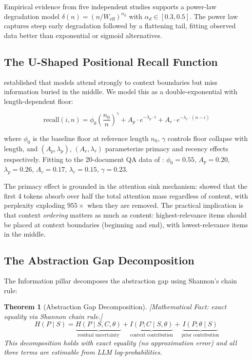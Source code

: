 \documentclass[11pt, a4paper, logo, copyright]{googledeepmind}
\newtheorem{theorem}{Theorem}[section]
\begin{document}
Empirical evidence from five independent studies \citep{chroma2025contextrot, liu2024lost, du2025context} supports a power-law degradation model $\delta(n) = (n/W_{\text{eff}})^{\alpha_d}$ with $\alpha_d \in [0.3, 0.5]$. The power law captures steep early degradation followed by a flattening tail, fitting observed data better than exponential or sigmoid alternatives.

\subsection{The U-Shaped Positional Recall Function}

\citet{liu2024lost} established that models attend strongly to context boundaries but miss information buried in the middle. We model this as a double-exponential with length-dependent floor:

\begin{equation}
    \text{recall}(i, n) = \phi_0 \left(\frac{n_0}{n}\right)^{\!\gamma} + A_p \cdot e^{-\lambda_p \cdot i} + A_r \cdot e^{-\lambda_r \cdot (n - i)}
\end{equation}

where $\phi_0$ is the baseline floor at reference length $n_0$, $\gamma$ controls floor collapse with length, and $(A_p, \lambda_p)$, $(A_r, \lambda_r)$ parameterize primacy and recency effects respectively. Fitting to the 20-document QA data of \citet{liu2024lost}: $\phi_0 = 0.55$, $A_p = 0.20$, $\lambda_p = 0.26$, $A_r = 0.17$, $\lambda_r = 0.15$, $\gamma = 0.23$.

The primacy effect is grounded in the attention sink mechanism: \citet{xiao2024efficient} showed that the first 4 tokens absorb over half the total attention mass regardless of content, with perplexity exploding $955\times$ when they are removed. The practical implication is that context \emph{ordering} matters as much as content: highest-relevance items should be placed at context boundaries (beginning and end), with lowest-relevance items in the middle.

\subsection{The Abstraction Gap Decomposition}

The Information pillar decomposes the abstraction gap using Shannon's chain rule:

\begin{theorem}[Abstraction Gap Decomposition]
\emph{[Mathematical Fact: exact equality via Shannon chain rule.]}
\label{thm:gap-decomposition}
\begin{equation}
    H(P \mid S) = \underbrace{H(P \mid S, C, \theta)}_{\text{residual uncertainty}} + \underbrace{I(P; C \mid S, \theta)}_{\text{context contribution}} + \underbrace{I(P; \theta \mid S)}_{\text{prior contribution}}
\end{equation}
This decomposition holds with exact equality (no approximation error) and all three terms are estimable from LLM log-probabilities.
\end{theorem}
\end{document}

